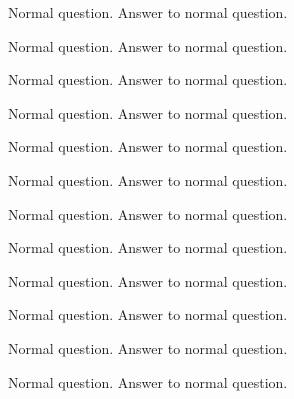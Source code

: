 \documentclass{../../flashcards}
\begin{document}
\begin{card}{\blindtext[4]}
\blindtext[4]
\end{card}


\begin{card}{\blindtext[4]}
\blindtext[4]
\end{card}


\begin{card}{Normal question.}
Answer to normal question.
\end{card}


\begin{card}{Normal question.}
Answer to normal question.
\end{card}


\begin{card}{Normal question.}
Answer to normal question.
\end{card}


\begin{card}{Normal question.}
Answer to normal question.
\end{card}


\begin{card}{Normal question.}
Answer to normal question.
\end{card}


\begin{card}{Normal question.}
Answer to normal question.
\end{card}


\begin{card}{Normal question.}
Answer to normal question.
\end{card}


\begin{card}{Normal question.}
Answer to normal question.
\end{card}


\begin{card}{Normal question.}
Answer to normal question.
\end{card}


\begin{card}{Normal question.}
Answer to normal question.
\end{card}


\begin{card}{Normal question.}
Answer to normal question.
\end{card}


\begin{card}{Normal question.}
Answer to normal question.
\end{card}
\end{document}
